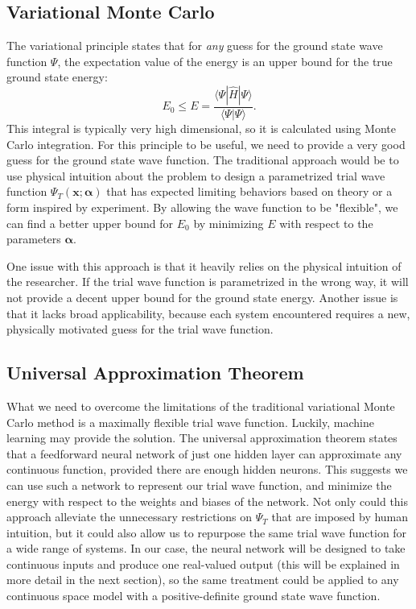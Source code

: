 \documentclass[prb,aps,twocolumn,showpacs,10pt]{revtex4-1}
\begin{document}

\subsection{Variational Monte Carlo}

The variational principle states that for \textit{any} guess for the ground state wave function $\Psi$, the expectation value of the energy is an upper bound for the true ground state energy:
\begin{equation}
E_0 \leq E = \frac{\langle \Psi | \hat{H} | \Psi \rangle}{\langle \Psi |  \Psi \rangle}.
\end{equation}
This integral is typically very high dimensional, so it is calculated using Monte Carlo integration.  For this principle to be useful, we need to provide a very good guess for the ground state wave function. The traditional approach would be to use physical intuition about the problem to design a parametrized trial wave function $\Psi_T(\bm{x}; \bm{\alpha})$ that has expected limiting behaviors based on theory or a form inspired by experiment. By allowing the wave function to be "flexible", we can find a better upper bound for $E_0$ by minimizing $E$ with respect to the parameters $\bm{\alpha}$. 

One issue with this approach is that it heavily relies on the physical intuition of the researcher. If the trial wave function is parametrized in the wrong way, it will not provide a decent upper bound for the ground state energy. Another issue is that it lacks broad applicability, because each system encountered requires a new, physically motivated guess for the trial wave function.


\subsection{Universal Approximation Theorem}

What we need to overcome the limitations of the traditional variational Monte Carlo method is a maximally flexible trial wave function. Luckily, machine learning may provide the solution. The universal approximation theorem states that a feedforward neural network of just one hidden layer can approximate any continuous function, provided there are enough hidden neurons. This suggests we can use such a network to represent our trial wave function, and minimize the energy with respect to the weights and biases of the network. Not only could this approach alleviate the unnecessary restrictions on $\Psi_T$ that are imposed by human intuition, but it could also allow us to repurpose the same trial wave function for a wide range of systems. In our case, the neural network will be designed to take continuous inputs and produce one real-valued output (this will be explained in more detail in the next section), so the same treatment could be applied to any continuous space model with a positive-definite ground state wave function. 
\end{document}
